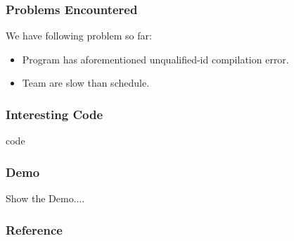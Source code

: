 \documentclass{beamer}
\begin{document}
\begin{frame}
  \frametitle{Problems Encountered}
  We have following problem so far:
  \begin{itemize}
    \item Program has aforementioned unqualified-id compilation error. 
    \item Team are slow than schedule.
  \end{itemize}
\end{frame}

\begin{frame}
  \frametitle{Interesting Code}
  code
\end{frame}

\begin{frame}
  \frametitle{Demo}
    Show the Demo....
\end{frame}

\begin{frame}
	\frametitle{Reference}
    \printbibliography
\end{frame}
\end{document}
